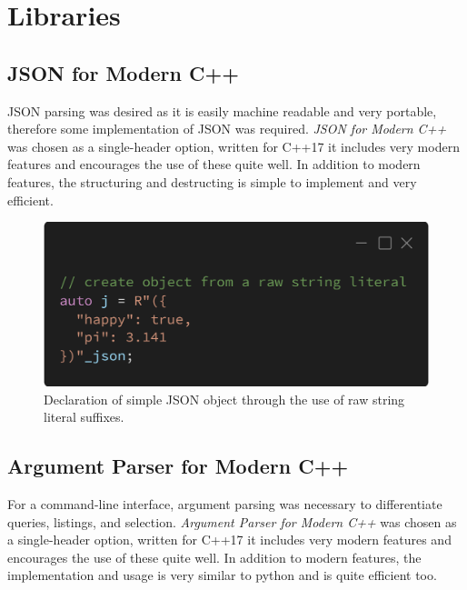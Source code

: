 \documentclass[conference]{IEEEtran}
\begin{document}
\section{Libraries}

\subsection{JSON for Modern C++}
JSON parsing was desired as it is easily machine readable and very portable, therefore some implementation of JSON was required.
\textit{JSON for Modern C++} was chosen as a single-header option, written for C++17 it includes very modern features and encourages the use of these quite well.
In addition to modern features, the structuring and destructing is simple to implement and very efficient.

\begin{figure}[!t]
    \centering
    \includegraphics[width=\linewidth]{fig-json}
    \caption{Declaration of simple JSON object through the use of raw string literal suffixes.}
    \label{fig-json}
\end{figure}

\subsection{Argument Parser for Modern C++}
For a command-line interface, argument parsing was necessary to differentiate queries, listings, and selection.
\textit{Argument Parser for Modern C++} was chosen as a single-header option, written for C++17 it includes very modern features and encourages the use of these quite well.
In addition to modern features, the implementation and usage is very similar to python and is quite efficient too.
\end{document}
